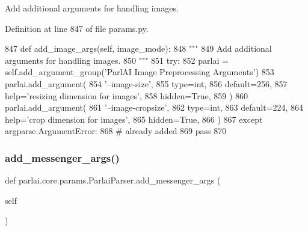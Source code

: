 \begin{DoxyVerb}Add additional arguments for handling images.
\end{DoxyVerb}
 

Definition at line 847 of file params.\+py.


\begin{DoxyCode}
847     \textcolor{keyword}{def }add\_image\_args(self, image\_mode):
848         \textcolor{stringliteral}{"""}
849 \textcolor{stringliteral}{        Add additional arguments for handling images.}
850 \textcolor{stringliteral}{        """}
851         \textcolor{keywordflow}{try}:
852             parlai = self.add\_argument\_group(\textcolor{stringliteral}{'ParlAI Image Preprocessing Arguments'})
853             parlai.add\_argument(
854                 \textcolor{stringliteral}{'--image-size'},
855                 type=int,
856                 default=256,
857                 help=\textcolor{stringliteral}{'resizing dimension for images'},
858                 hidden=\textcolor{keyword}{True},
859             )
860             parlai.add\_argument(
861                 \textcolor{stringliteral}{'--image-cropsize'},
862                 type=int,
863                 default=224,
864                 help=\textcolor{stringliteral}{'crop dimension for images'},
865                 hidden=\textcolor{keyword}{True},
866             )
867         \textcolor{keywordflow}{except} argparse.ArgumentError:
868             \textcolor{comment}{# already added}
869             \textcolor{keywordflow}{pass}
870 
\end{DoxyCode}
\mbox{\label{classparlai_1_1core_1_1params_1_1ParlaiParser_aed38c7346112f11851969224cb25ad1e}} 
\subsubsection{\texorpdfstring{add\+\_\+messenger\+\_\+args()}{add\_messenger\_args()}}
{\footnotesize\ttfamily def parlai.\+core.\+params.\+Parlai\+Parser.\+add\+\_\+messenger\+\_\+args (\begin{DoxyParamCaption}\item[{}]{self }\end{DoxyParamCaption})}

